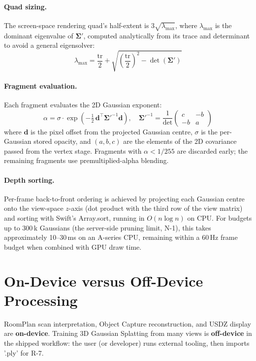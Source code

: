 \paragraph{Quad sizing.}
The screen-space rendering quad's half-extent is $3\sqrt{\lambda_{\max}}$, where $\lambda_{\max}$ is the dominant eigenvalue of $\boldsymbol{\Sigma}'$, computed analytically from its trace and determinant to avoid a general eigensolver:
\[
    \lambda_{\max} = \frac{\mathrm{tr}}{2} + \sqrt{\left(\frac{\mathrm{tr}}{2}\right)^2 - \det(\boldsymbol{\Sigma}')}
\]

\paragraph{Fragment evaluation.}
Each fragment evaluates the 2D Gaussian exponent:
\[
    \alpha = \sigma \cdot \exp\!\left(-\tfrac{1}{2}\,
        \mathbf{d}^\top {\boldsymbol{\Sigma}'}^{-1} \mathbf{d}\right),\quad
    {\boldsymbol{\Sigma}'}^{-1} = \frac{1}{\det}\begin{pmatrix}c & -b \\ -b & a\end{pmatrix}
\]
where $\mathbf{d}$ is the pixel offset from the projected Gaussian centre, $\sigma$ is the per-Gaussian stored opacity, and $(a,b,c)$ are the elements of the 2D covariance passed from the vertex stage. Fragments with $\alpha < 1/255$ are discarded early; the remaining fragments use premultiplied-alpha blending.

\paragraph{Depth sorting.}
Per-frame back-to-front ordering is achieved by projecting each Gaussian centre onto the view-space $z$-axis (dot product with the third row of the view matrix) and sorting with Swift's Array.sort, running in $O(n \log n)$ on CPU. For budgets up to 300\,k Gaussians (the server-side pruning limit, N-1), this takes approximately 10–30\,ms on an A-series CPU, remaining within a 60\,Hz frame budget when combined with GPU draw time.

\section{On-Device versus Off-Device Processing}

RoomPlan scan interpretation, Object Capture reconstruction, and USDZ display are \textbf{on-device}. Training 3D Gaussian Splatting from many views is \textbf{off-device} in the shipped workflow: the user (or developer) runs external tooling, then imports '.ply' for R-7.

